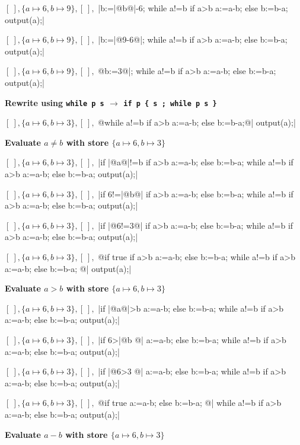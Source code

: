 \documentclass[11pt]{book}
\newcommand{\outdent}{\noindent\hspace*{-1.5cm}}
\newcommand{\outtext}[1]{{\outdent\normalsize\bf #1}}
\begin{document}
{ 
\outdent$  [\ ],\{a \mapsto 6, b \mapsto 9\},[\ ],$ 
|b:=|@b@|-6; while a!=b if a>b a:=a-b; else b:=b-a; output(a);|$  $
 
\outdent$  [\ ],\{a \mapsto 6, b \mapsto 9\},[\ ],$ 
|b:=|@9-6@|; while a!=b if a>b a:=a-b; else b:=b-a; output(a);|$  $

\outdent$  [\ ],\{a \mapsto 6, b \mapsto 9\},[\ ],$ 
@b:=3@|; while a!=b if a>b a:=a-b; else b:=b-a; output(a);|$  $


\outtext{Rewrite using {\tt while p s} $\rightarrow$ {\tt if p \{ s ; while p s \}}}

\outdent$  [\ ],\{a \mapsto 6, b \mapsto 3\},[\ ],$ 
@while a!=b if a>b a:=a-b; else b:=b-a;@| output(a);|$  $

\outtext{Evaluate $ a \ne b$ with store $\{a \mapsto 6, b \mapsto 3\}$}

\outdent$  [\ ],\{a \mapsto 6, b \mapsto 3\},[\ ],$ 
|if |@a@|!=b { if a>b a:=a-b; else b:=b-a; while a!=b if a>b a:=a-b; else b:=b-a; } output(a);|$  $

\outdent$  [\ ],\{a \mapsto 6, b \mapsto 3\},[\ ],$ 
|if 6!=|@b@| { if a>b a:=a-b; else b:=b-a; while a!=b if a>b a:=a-b; else b:=b-a; } output(a);|$  $

\outdent$  [\ ],\{a \mapsto 6, b \mapsto 3\},[\ ],$ 
|if |@6!=3@| { if a>b a:=a-b; else b:=b-a; while a!=b if a>b a:=a-b; else b:=b-a; } output(a);|$  $

\outdent$  [\ ],\{a \mapsto 6, b \mapsto 3\},[\ ],$ 
@if true { if a>b a:=a-b; else b:=b-a; while a!=b if a>b a:=a-b; else b:=b-a; } @| output(a);|$  $

\outtext{Evaluate $ a > b$ with store $\{a \mapsto 6, b \mapsto 3\}$}

\outdent$  [\ ],\{a \mapsto 6, b \mapsto 3\},[\ ],$ 
|if |@a@|>b a:=a-b; else b:=b-a; while a!=b if a>b a:=a-b; else b:=b-a; output(a);|$  $
 
\outdent$  [\ ],\{a \mapsto 6, b \mapsto 3\},[\ ],$ 
|if 6>|@b @| a:=a-b; else b:=b-a; while a!=b if a>b a:=a-b; else b:=b-a; output(a);|$  $
 
\outdent$  [\ ],\{a \mapsto 6, b \mapsto 3\},[\ ],$ 
|if |@6>3 @| a:=a-b; else b:=b-a; while a!=b if a>b a:=a-b; else b:=b-a; output(a);|$  $
 
\outdent$  [\ ],\{a \mapsto 6, b \mapsto 3\},[\ ],$ 
@if true a:=a-b; else b:=b-a; @| while a!=b if a>b a:=a-b; else b:=b-a; output(a);|$  $

\outtext{Evaluate $a-b$ with store $\{a \mapsto 6, b \mapsto 3\}$}
 
}
\end{document}
